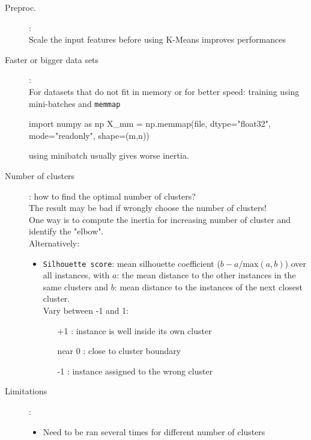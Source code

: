 \begin{description}
    \item[Preproc.]: \hfill\\
        Scale the input features before using K-Means \arrow improves performances
    \item[Faster or bigger data sets]: \hfill\\
        For datasets that do not fit in memory or for better speed: training using mini-batches and \verb;memmap;
        \begin{python}
            import numpy as np
            X_mm = np.memmap(file, dtype="float32", mode="readonly", shape=(m,n))
        \end{python}
        using minibatch usually gives worse inertia.
    \item[Number of clusters]: how to find the optimal number of clusters? \hfill\\
        The result may be bad if wrongly choose the number of clusters!\\
        One way is to compute the inertia for increasing number of cluster and identify the "elbow".\\
        Alternatively:\\
        \begin{itemize}
            \item \verb;Silhouette score;: mean silhouette coefficient ($b-a/\mathrm{max}(a,b)$) over all instances,
                with $a$: the mean distance to the other instances in the same clusters and $b$: mean distance to the
                instances of the next closest cluster.\\
                Vary between -1 and 1:
                \begin{itemize}
                    \item[+1] : instance is well inside its own cluster
                    \item[near 0] : close to cluster boundary
                    \item[-1] : instance assigned to the wrong cluster
                \end{itemize}
        \end{itemize}
        \begin{python}
        \end{python}
    \item[Limitations]: \hfill\\
        \begin{itemize}
            \item Need to be ran several times for different number of clusters

\end{itemize}
\end{description}
